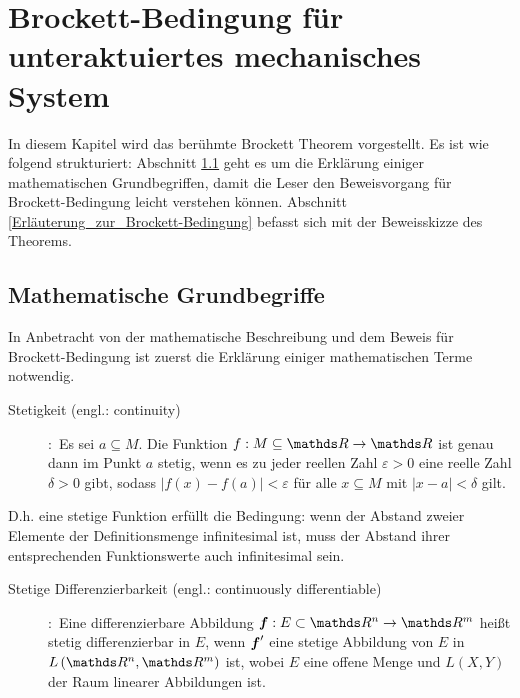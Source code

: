 \chapter{Brockett-Bedingung für unteraktuiertes mechanisches System}
\label{ch:Brockett_Bedingung_für_unteraktuiertes_mechanisches_System}
In diesem Kapitel wird das berühmte Brockett Theorem vorgestellt. Es ist wie folgend strukturiert: Abschnitt \ref{Mathematische Grundbegriffe} geht es um die Erklärung einiger mathematischen Grundbegriffen, damit die Leser den Beweisvorgang für Brockett-Bedingung leicht verstehen können. Abschnitt \ref{Erläuterung_zur_Brockett-Bedingung} befasst sich mit der Beweisskizze des Theorems.

\section{Mathematische Grundbegriffe}
\label{Mathematische Grundbegriffe}
In Anbetracht von der mathematische Beschreibung und dem Beweis für Brockett-Bedingung ist zuerst die Erklärung einiger mathematischen Terme notwendig. 
\begin{Def}   
	\begin{description} 
		\item[Stetigkeit (engl.: continuity)]
		\cite[S. 250]{grosche2003teubner}:~Es sei $a\subseteq M$. Die Funktion $f:M\subseteq\Reals\to\Reals$ ist genau dann im Punkt $a$ stetig, wenn es zu jeder reellen Zahl $\varepsilon>0$ eine reelle Zahl $\delta>0$ gibt, sodass
		$\left | f\left ( x \right )-f\left ( a \right ) \right |< \varepsilon$ für alle $x\subseteq M$ mit $\left | x-a \right |< \delta $ gilt.  
	\end{description}
\end{Def}
\vspace{-0.8em}
D.h. eine stetige Funktion erfüllt die Bedingung: wenn der Abstand zweier Elemente der Definitionsmenge infinitesimal ist, muss der Abstand ihrer entsprechenden Funktionswerte auch infinitesimal sein.
\begin{Def}
	\begin{description}
		\item[Stetige Differenzierbarkeit (engl.: continuously differentiable)]
		\cite[S. 256]{rudin2009analysis}:~Eine differenzierbare Abbildung $\vect{f}:E\subset\Reals^{n}\to \Reals^{m}$ heißt stetig differenzierbar in $E$, wenn ${\boldsymbol f}'$ eine stetige Abbildung von $E$ in $L\left ( \Reals^{n},\Reals^{m} \right )$ ist, wobei $E$ eine offene Menge und $L\left ( X,Y \right )$ der Raum linearer Abbildungen ist.
	\end{description}
\end{Def}	
